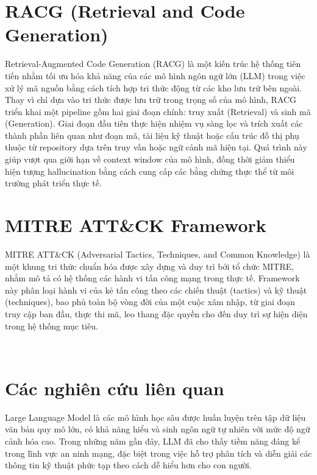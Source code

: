 \section{RACG (Retrieval and Code Generation)}

Retrieval-Augmented Code Generation (RACG) là một kiến trúc hệ thống tiên tiến nhằm tối ưu hóa khả năng của các mô hình ngôn ngữ lớn (LLM) trong việc xử lý mã nguồn bằng cách tích hợp tri thức động từ các kho lưu trữ bên ngoài. Thay vì chỉ dựa vào tri thức được lưu trữ trong trọng số của mô hình, RACG triển khai một pipeline gồm hai giai đoạn chính: truy xuất (Retrieval) và sinh mã (Generation). Giai đoạn đầu tiên thực hiện nhiệm vụ sàng lọc và trích xuất các thành phần liên quan như đoạn mã, tài liệu kỹ thuật hoặc cấu trúc đồ thị phụ thuộc từ repository dựa trên truy vấn hoặc ngữ cảnh mã hiện tại. Quá trình này giúp vượt qua giới hạn về context window của mô hình, đồng thời giảm thiểu hiện tượng hallucination bằng cách cung cấp các bằng chứng thực thể từ môi trường phát triển thực tế.





\section{MITRE ATT\&CK Framework}

MITRE ATT\&CK (Adversarial Tactics, Techniques, and Common Knowledge) là một khung tri thức chuẩn hóa được xây dựng và duy trì bởi tổ chức MITRE, nhằm mô tả có hệ thống các hành vi tấn công mạng trong thực tế. Framework này phân loại hành vi của kẻ tấn công theo các chiến thuật (tactics) và kỹ thuật (techniques), bao phủ toàn bộ vòng đời của một cuộc xâm nhập, từ giai đoạn truy cập ban đầu, thực thi mã, leo thang đặc quyền cho đến duy trì sự hiện diện trong hệ thống mục tiêu.

\


\section{Các nghiên cứu liên quan}

Large Language Model là các mô hình học sâu được huấn luyện trên tập dữ liệu văn bản quy mô lớn, có khả năng hiểu và sinh ngôn ngữ tự nhiên với mức độ ngữ cảnh hóa cao. Trong những năm gần đây, LLM đã cho thấy tiềm năng đáng kể trong lĩnh vực an ninh mạng, đặc biệt trong việc hỗ trợ phân tích và diễn giải các thông tin kỹ thuật phức tạp theo cách dễ hiểu hơn cho con người.







